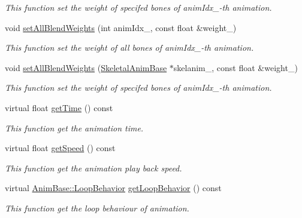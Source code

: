 \begin{DoxyCompactItemize}
\begin{DoxyCompactList}\small\item\em This function set the weight of specifed bones of anim\+Idx\+\_\+-\/th animation. \end{DoxyCompactList}\item 
void \hyperlink{class_magnum_1_1_skeletal_anim_blender_a358dfbf2b4345c216156a6d50c5e6e20}{set\+All\+Blend\+Weights} (int anim\+Idx\+\_\+, const float \&weight\+\_\+)
\begin{DoxyCompactList}\small\item\em This function set the weight of all bones of anim\+Idx\+\_\+-\/th animation. \end{DoxyCompactList}\item 
void \hyperlink{class_magnum_1_1_skeletal_anim_blender_a7912c9db93ae4237c518475c34811ed0}{set\+All\+Blend\+Weights} (\hyperlink{class_magnum_1_1_skeletal_anim_base}{Skeletal\+Anim\+Base} $\ast$skelanim\+\_\+, const float \&weight\+\_\+)
\begin{DoxyCompactList}\small\item\em This function set the weight of specifed bones of anim\+Idx\+\_\+-\/th animation. \end{DoxyCompactList}\item 
virtual float \hyperlink{class_magnum_1_1_skeletal_anim_blender_a1c35d25c9c59c8d867271004a36be82a}{get\+Time} () const 
\begin{DoxyCompactList}\small\item\em This function get the animation time. \end{DoxyCompactList}\item 
virtual float \hyperlink{class_magnum_1_1_skeletal_anim_blender_a1a5fb941a66118b46991c41e7a77d6ad}{get\+Speed} () const 
\begin{DoxyCompactList}\small\item\em This function get the animation play back speed. \end{DoxyCompactList}\item 
virtual \hyperlink{class_magnum_1_1_anim_base_ad6b3de9518d395df5ca9865f268ec581}{Anim\+Base\+::\+Loop\+Behavior} \hyperlink{class_magnum_1_1_skeletal_anim_blender_a1f09f358071ec980a3783db1cc63c609}{get\+Loop\+Behavior} () const 
\begin{DoxyCompactList}\small\item\em This function get the loop behaviour of animation. \end{DoxyCompactList}\item 

\end{DoxyCompactItemize}
